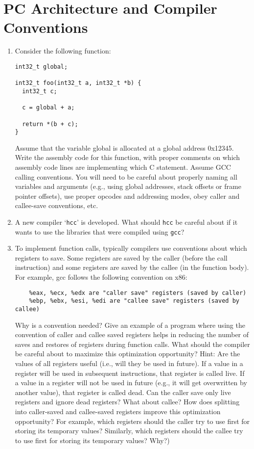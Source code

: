 \section{PC Architecture and Compiler Conventions}
\begin{enumerate}
\item Consider the following function:
\begin{verbatim}
int32_t global;

int32_t foo(int32_t a, int32_t *b) {
  int32_t c;

  c = global + a;
  
  return *(b + c);
}
\end{verbatim}
Assume that the variable global is allocated at a global address 0x12345. Write
the assembly code for this function, with proper comments on which assembly code
lines are implementing which C statement. Assume GCC calling conventions. You will
need to be careful about properly naming all variables and
arguments (e.g., using global addresses, stack offsets or frame pointer offsets),
use proper opcodes and addressing modes, obey caller and callee-save conventions, etc. 

\item A new compiler ‘{\tt hcc}’ is developed. What should {\tt hcc} be careful about if it wants to use the
libraries that were compiled using {\tt gcc}?

\item To implement function calls, typically compilers use conventions about which registers
to save. Some registers are saved by the caller (before the call instruction) and some
registers are saved by the callee (in the function body). For example, gcc follows the
following convention on x86:
\begin{verbatim}
    %eax, %ecx, %edx are "caller save" registers (saved by caller)
    %ebp, %ebx, %esi, %edi are "callee save" registers (saved by callee) 
\end{verbatim}
Why is a convention needed?
Give an example of a program where using the convention of caller and callee saved registers helps in reducing the number of saves and restores of registers during function calls. What should the compiler be careful about to maximize this optimization opportunity? Hint: Are the values of all registers useful (i.e., will they be used in future). If a value in a register will be used in subsequent instructions, that register is called live. If a value in a register will not be used in future (e.g., it will get overwritten by another value), that register is called dead. Can the caller save only live registers and ignore dead registers? What about callee? How does splitting into caller-saved and callee-saved registers improve this optimization opportunity? For example, which registers should the caller try to use first for storing its temporary values? Similarly, which registers should the callee try to use first for storing its temporary values? Why?) 


\end{enumerate}
